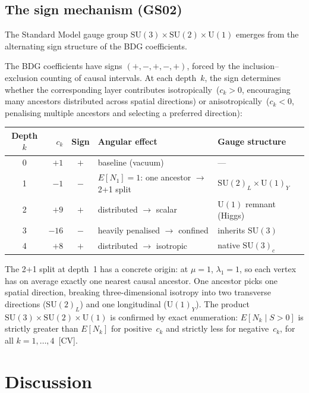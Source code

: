 \documentclass[12pt,a4paper]{article}
\begin{document}
\subsection{The sign mechanism (GS02)}\label{sec:gs02}

The Standard Model gauge group $\mathrm{SU}(3) \times \mathrm{SU}(2) \times \mathrm{U}(1)$ emerges from the alternating sign structure of the BDG coefficients.

The BDG coefficients have signs $(+,-,+,-,+)$, forced by the inclusion--exclusion counting of causal intervals. At each depth~$k$, the sign determines whether the corresponding layer contributes isotropically~($c_k > 0$, encouraging many ancestors distributed across spatial directions) or anisotropically~($c_k < 0$, penalising multiple ancestors and selecting a preferred direction):

\begin{center}
\begin{tabular}{@{}crcll@{}}
\toprule
Depth $k$ & $c_k$ & Sign & Angular effect & Gauge structure \\
\midrule
0 & $+1$  & $+$ & baseline (vacuum) & --- \\
1 & $-1$  & $-$ & $E[N_1]=1$: one ancestor $\to$ 2+1 split & $\mathrm{SU}(2)_L \times \mathrm{U}(1)_Y$ \\
2 & $+9$  & $+$ & distributed $\to$ scalar & $\mathrm{U}(1)$ remnant (Higgs) \\
3 & $-16$ & $-$ & heavily penalised $\to$ confined & inherits $\mathrm{SU}(3)$ \\
4 & $+8$  & $+$ & distributed $\to$ isotropic & native $\mathrm{SU}(3)_c$ \\
\bottomrule
\end{tabular}
\end{center}

\noindent The 2+1 split at depth~1 has a concrete origin: at $\mu=1$, $\lambda_1 = 1$, so each vertex has on average exactly one nearest causal ancestor. One ancestor picks one spatial direction, breaking three-dimensional isotropy into two transverse directions ($\mathrm{SU}(2)_L$) and one longitudinal ($\mathrm{U}(1)_Y$). The product $\mathrm{SU}(3) \times \mathrm{SU}(2) \times \mathrm{U}(1)$ is confirmed by exact enumeration: $E[N_k \mid S > 0]$ is strictly greater than $E[N_k]$ for positive~$c_k$ and strictly less for negative~$c_k$, for all $k = 1,\ldots,4$~[CV].

\section{Discussion}\label{sec:discussion}
\end{document}
